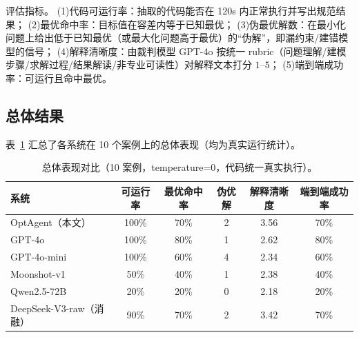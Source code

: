 \documentclass[11pt]{article}
\begin{document}
评估指标。
(1)代码可运行率：抽取的代码能否在 120s 内正常执行并写出规范结果；
(2)最优命中率：目标值在容差内等于已知最优；
(3)伪最优解数：在最小化问题上给出低于已知最优（或最大化问题高于最优）的“伪解”，即漏约束/建错模型的信号；
(4)解释清晰度：由裁判模型 GPT-4o 按统一 rubric（问题理解/建模步骤/求解过程/结果解读/非专业可读性）对解释文本打分 $1\text{--}5$；
(5)端到端成功率：可运行且命中最优。

\subsection{总体结果}

表~\ref{tab:overall} 汇总了各系统在 10 个案例上的总体表现（均为真实运行统计）。

\begin{table}[t]
\centering
\caption{总体表现对比（10 案例，temperature=0，代码统一真实执行）。}
\label{tab:overall}
\small
\begin{tabular}{lccccc}
\toprule
系统 & 可运行率 & 最优命中率 & 伪优解 & 解释清晰度 & 端到端成功率 \\
\midrule
OptAgent（本文） & 100\% & 70\% & 2 & 3.56 & 70\% \\
GPT-4o & 100\% & 80\% & 1 & 2.62 & 80\% \\
GPT-4o-mini & 100\% & 60\% & 4 & 2.34 & 60\% \\
Moonshot-v1 & 50\% & 40\% & 1 & 2.38 & 40\% \\
Qwen2.5-72B & 20\% & 20\% & 0 & 2.18 & 20\% \\
DeepSeek-V3-raw（消融） & 90\% & 70\% & 2 & 3.42 & 70\% \\
\bottomrule
\end{tabular}
\end{table}
\end{document}
